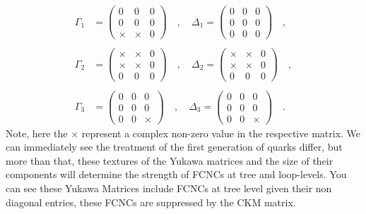 \begin{equation}
\begin{split}
\Gamma_1 & = \begin{pmatrix}
0 & 0 & 0\\
0 & 0 & 0\\
\times & \times & 0
\end{pmatrix}
\quad , \quad 
\Delta_1 = \begin{pmatrix}
0 & 0 & 0\\
0 & 0 & 0\\
0 & 0 & 0
\end{pmatrix} \quad , \\
& \\
\Gamma_2 & = \begin{pmatrix}
\times & \times & 0\\
\times & \times & 0\\
0 & 0 & 0
\end{pmatrix}
\quad , \quad 
\Delta_2 = \begin{pmatrix}
\times & \times & 0\\
\times & \times & 0\\
0 & 0 & 0
\end{pmatrix} \quad , \\ 
& \\ 
\Gamma_3 & = \begin{pmatrix}
0 & 0 & 0\\
0 & 0 & 0\\
0 & 0 & \times
\end{pmatrix}
\quad , \quad 
\Delta_3 = \begin{pmatrix}
0 & 0 & 0\\
0 & 0 & 0\\
0 & 0 & \times
\end{pmatrix} \quad . 
\end{split} 
\end{equation}
Note, here the $\times$ represent a complex non-zero value in the respective matrix. 
%
We can immediately see the treatment of the first generation of quarks differ, 
%
%
but more than that, these textures of the Yukawa matrices and the size of their components will determine the strength of FCNCs at tree and loop-levels. 
%
You can see these Yukawa Matrices include FCNCs at tree level given their non diagonal entries, these FCNCs are suppressed by the CKM matrix. 
%
 
